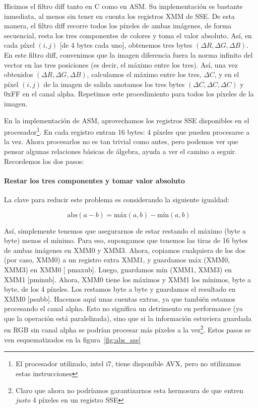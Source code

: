 Hicimos el filtro {\ttfamily diff} tanto en C como en ASM. Su
implementación es bastante inmediata, al menos sin tener en cuenta los
registros {\ttfamily XMM} de {\ttfamily SSE}. De esta manera, el
filtro {\ttfamily diff} recorre todos los píxeles de ambas imágenes,
de forma secuencial, resta los tres componentes de colores y toma el
valor absoluto. Así, en cada píxel $(i, j)$ [de 4 bytes cada uno],
obtenemos tres bytes $(\Delta R, \Delta G, \Delta B)$. En este filtro
{\ttfamily diff}, convenimos que la imagen diferencia fuera la norma
infinito del vector en las tres posiciones (es decir, el máximo entre
los tres). Así, una vez obtenidos $(\Delta R, \Delta G, \Delta B)$,
calculamos el máximo entre los tres, $\Delta C$, y en el píxel
$(i, j)$ de la imagen de salida anotamos los tres bytes
$(\Delta C, \Delta C, \Delta C)$ y 0xFF en el canal
alpha. Repetimos este procedimiento para todos los píxeles de la
imagen.

En la implementación de ASM, aprovechamos los registros {\ttfamily
  SSE} disponibles en el procesador\footnote{El procesador utilizado,
  intel i7, tiene disponible {\ttfamily AVX}, pero no utilizamos estas
  instrucciones}. En cada registro entran 16 bytes: 4 píxeles que
pueden procesarse a la vez. Ahora procesarlos no es tan trivial como
antes, pero podemos ver que pensar algunas relaciones básicas de
álgebra, ayuda a ver el camino a seguir. Recordemos los dos pasos:

\paragraph{Restar los tres componentes y tomar valor absoluto} La clave
para reducir este problema es considerando la siguiente igualdad:

\begin{equation}
  \text{abs}(a - b) = \text{máx}(a, b) - \text{mín}(a, b)
\end{equation}

Así, simplemente tenemos que asegurarnos de estar restando el máximo
(byte a byte) menos el mínimo. Para eso, supongamos que tenemos las
tiras de 16 bytes de ambas imágenes en {\ttfamily XMM0} y {\ttfamily
  XMM3}. Ahora, copiamos cualquiera de los dos (por caso, {\ttfamily
  XMM0}) a un registro extra {\ttfamily XMM1}, y guardamos
{\ttfamily máx (XMM0, XMM3)} en {\ttfamily XMM0} [{\ttfamily
  pmaxub}]. Luego, guardamos {\ttfamily mín (XMM1, XMM3)} en
{\ttfamily XMM1} [{\ttfamily pminub}]. Ahora, {\ttfamily XMM0} tiene
los máximos y {\ttfamily XMM1} los mínimos, byte a byte, de los 4
píxeles. Los restamos byte a byte y guardamos el resultado en
{\ttfamily XMM0} [{\ttfamily psubb}]. Hacemos aquí unas cuentas
extras, ya que también estamos procesando el canal alpha. Esto no
significa un detrimento en performance (ya que la operación está
paralelizada), sino que si la información estuviera guardada en RGB
sin canal alpha se podrían procesar más píxeles a la
vez\footnote{Claro que ahora no podríamos garantizarnos esta
  hermosura de que entren \emph{justo} 4 píxeles en un registro
  {\ttfamily SSE}}. Estos pasos se ven esquematizados en la
figura~\ref{fig:abs_sse}

